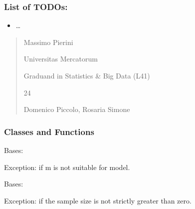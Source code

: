 \documentclass[letterpaper,10pt,english]{sphinxmanual}
\begin{document}
\subsubsection{List of TODOs:}
\label{\detokenize{cubmods:id247}}\begin{itemize}
\item {} 
\sphinxAtStartPar
…

\end{itemize}
\begin{quote}\begin{description}
\sphinxAtStartPar
Massimo Pierini

\sphinxAtStartPar
Universitas Mercatorum

\sphinxAtStartPar
Graduand in Statistics \& Big Data (L41)

\sphinxhyphen{}24

\sphinxAtStartPar
Domenico Piccolo, Rosaria Simone

\sphinxAtStartPar
{}

\end{description}\end{quote}


\subsubsection{Classes and Functions}
\label{\detokenize{cubmods:id248}}

\begin{fulllineitems}
\label{\detokenize{cubmods:cubmods.general.InvalidCategoriesError}}
\pysigstartsignatures
{}
\pysigstopsignatures
\sphinxAtStartPar
Bases: 

\sphinxAtStartPar
Exception: if m is not suitable for model.

\end{fulllineitems}


\begin{fulllineitems}
\label{\detokenize{cubmods:cubmods.general.InvalidSampleSizeError}}
\pysigstartsignatures
{}
\pysigstopsignatures
\sphinxAtStartPar
Bases: 

\sphinxAtStartPar
Exception: if the sample size is not strictly greater than zero.

\end{fulllineitems}
\end{document}
